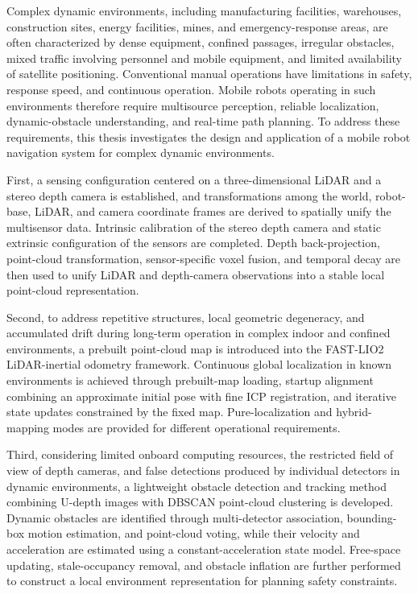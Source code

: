 

\enabstract Complex dynamic environments, including manufacturing facilities, warehouses, construction sites, energy facilities, mines, and emergency-response areas, are often characterized by dense equipment, confined passages, irregular obstacles, mixed traffic involving personnel and mobile equipment, and limited availability of satellite positioning. Conventional manual operations have limitations in safety, response speed, and continuous operation. Mobile robots operating in such environments therefore require multisource perception, reliable localization, dynamic-obstacle understanding, and real-time path planning. To address these requirements, this thesis investigates the design and application of a mobile robot navigation system for complex dynamic environments.

First, a sensing configuration centered on a three-dimensional LiDAR and a stereo depth camera is established, and transformations among the world, robot-base, LiDAR, and camera coordinate frames are derived to spatially unify the multisensor data. Intrinsic calibration of the stereo depth camera and static extrinsic configuration of the sensors are completed. Depth back-projection, point-cloud transformation, sensor-specific voxel fusion, and temporal decay are then used to unify LiDAR and depth-camera observations into a stable local point-cloud representation.

Second, to address repetitive structures, local geometric degeneracy, and accumulated drift during long-term operation in complex indoor and confined environments, a prebuilt point-cloud map is introduced into the FAST-LIO2 LiDAR-inertial odometry framework. Continuous global localization in known environments is achieved through prebuilt-map loading, startup alignment combining an approximate initial pose with fine ICP registration, and iterative state updates constrained by the fixed map. Pure-localization and hybrid-mapping modes are provided for different operational requirements.

Third, considering limited onboard computing resources, the restricted field of view of depth cameras, and false detections produced by individual detectors in dynamic environments, a lightweight obstacle detection and tracking method combining U-depth images with DBSCAN point-cloud clustering is developed. Dynamic obstacles are identified through multi-detector association, bounding-box motion estimation, and point-cloud voting, while their velocity and acceleration are estimated using a constant-acceleration state model. Free-space updating, stale-occupancy removal, and obstacle inflation are further performed to construct a local environment representation for planning safety constraints.

